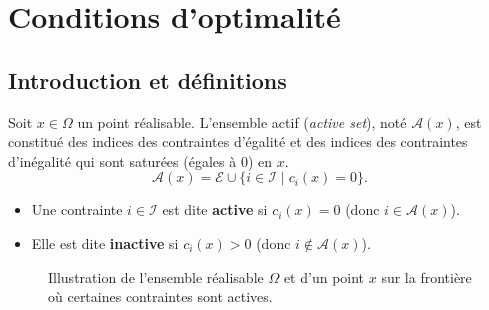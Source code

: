 \chapter{Conditions d'optimalité}
\label{chap:optimality-conditions}

\section{Introduction et définitions}

\begin{definition}
Soit $x \in \Omega$ un point réalisable. L'ensemble actif (\textit{active set}), noté $\mathcal{A}(x)$, est constitué des indices des contraintes d'égalité et des indices des contraintes d'inégalité qui sont saturées (égales à 0) en $x$.
\[
    \mathcal{A}(x) = \mathcal{E} \cup \{ i \in \mathcal{I} \mid c_i(x) = 0 \}.
\]
\begin{itemize}
    \item Une contrainte $i \in \mathcal{I}$ est dite \textbf{active} si $c_i(x) = 0$ (donc $i \in \mathcal{A}(x)$).
    \item Elle est dite \textbf{inactive} si $c_i(x) > 0$ (donc $i \notin \mathcal{A}(x)$).
\end{itemize}
\end{definition}

\begin{figure}[H]
\centering
{}
\caption{Illustration de l'ensemble réalisable $\Omega$ et d'un point $x$ sur la frontière où certaines contraintes sont actives.}
\label{fig:active-set}
\end{figure}

